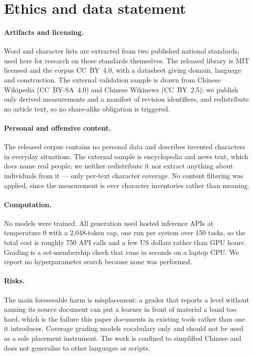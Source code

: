 \documentclass[11pt]{article}
\begin{document}
\section*{Ethics and data statement}

\paragraph{Artifacts and licensing.} Word and character lists are extracted from
two published national standards, used here for research on those standards
themselves. The released library is MIT licensed and the corpus CC~BY~4.0, with
a datasheet giving domain, language and construction. The external validation
sample is drawn from Chinese Wikipedia (CC~BY-SA~4.0) and Chinese Wikinews
(CC~BY~2.5); we publish only derived measurements and a manifest of revision
identifiers, and redistribute no article text, so no share-alike obligation is
triggered.

\paragraph{Personal and offensive content.} The released corpus contains no
personal data and describes invented characters in everyday situations. The
external sample is encyclopedia and news text, which does name real people; we
neither redistribute it nor extract anything about individuals from it --- only
per-text character coverage. No content filtering was applied, since the
measurement is over character inventories rather than meaning.

\paragraph{Computation.} No models were trained. All generation used hosted
inference APIs at temperature 0 with a 2{,}048-token cap, one run per system
over 150 tasks, so the total cost is roughly 750 API calls and a few US dollars
rather than GPU hours. Grading is a set-membership check that runs in seconds on
a laptop CPU. We report no hyperparameter search because none was performed.

\paragraph{Risks.} The main foreseeable harm is misplacement: a grader that
reports a level without naming its source document can put a learner in front of
material a band too hard, which is the failure this paper documents in existing
tools rather than one it introduces. Coverage grading models vocabulary only and
should not be used as a sole placement instrument. The work is confined to
simplified Chinese and does not generalise to other languages or scripts.
\end{document}
